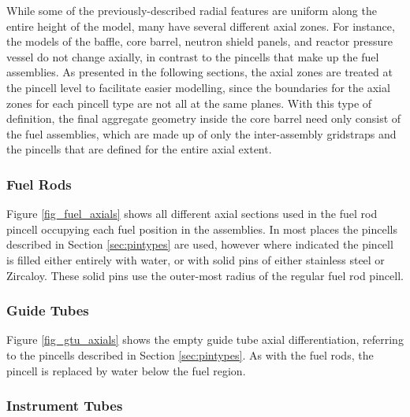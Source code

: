 
While some of the previously-described radial features are uniform along the
entire height of the model, many have several different axial zones. For
instance, the models of the baffle, core barrel, neutron shield panels, and
reactor pressure vessel do not change axially, in contrast to the pincells
that make up the fuel assemblies. As presented in the following sections, the
axial zones are treated at the pincell level to facilitate easier modelling,
since the boundaries for the axial zones for each pincell type are not all at
the same planes. With this type of definition, the final aggregate geometry
inside the core barrel need only consist of the fuel assemblies, which are made
up of only the inter-assembly gridstraps and the pincells that are defined for
the entire axial extent.

\subsubsection{Fuel Rods}

Figure \ref{fig_fuel_axials} shows all different axial sections used in the fuel
rod pincell occupying each fuel position in the assemblies.  In most
places the pincells described in Section \ref{sec:pintypes} are used, however
where indicated the pincell is filled either entirely with water, or with solid
pins of either stainless steel or Zircaloy.  These solid pins use the outer-most
radius of the regular fuel rod pincell.


\subsubsection{Guide Tubes}

Figure \ref{fig_gtu_axials} shows the empty guide tube axial differentiation,
referring to the pincells described in Section \ref{sec:pintypes}.  As with
the fuel rods, the pincell is replaced by water below the fuel region.


\subsubsection{Instrument Tubes}

